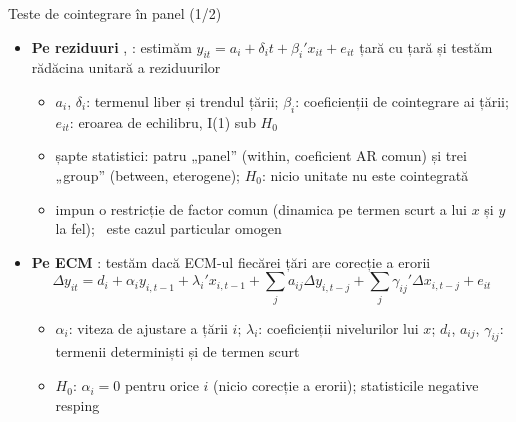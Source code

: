 \begin{frame}{Teste de cointegrare în panel (1/2)}
\itemsize{\small}
\begin{itemize}
    \item \textbf{Pe reziduuri} , : estimăm $y_{it} = a_i + \delta_it + \beta_i'x_{it} + e_{it}$ țară cu țară și testăm rădăcina unitară a reziduurilor
    \begin{itemize}
        \item $a_i$, $\delta_i$: termenul liber și trendul țării; $\beta_i$: coeficienții de cointegrare ai țării; $e_{it}$: eroarea de echilibru, I(1) sub $H_0$
        \item șapte statistici: patru „panel” (within, coeficient AR comun) și trei „group” (between, eterogene); $H_0$: nicio unitate nu este cointegrată
        \item impun o restricție de factor comun (dinamica pe termen scurt a lui $x$ și $y$ la fel); \ este cazul particular omogen
    \end{itemize}
    \item \textbf{Pe ECM} : testăm dacă ECM-ul fiecărei țări are corecție a erorii \[ \Delta y_{it} = d_i + \alpha_iy_{i,t-1} + \lambda_i'x_{i,t-1} + \sum_j a_{ij}\Delta y_{i,t-j} + \sum_j\gamma_{ij}'\Delta x_{i,t-j} + e_{it} \]
    \begin{itemize}
        \item $\alpha_i$: viteza de ajustare a țării $i$; $\lambda_i$: coeficienții nivelurilor lui $x$; $d_i$, $a_{ij}$, $\gamma_{ij}$: termenii determiniști și de termen scurt
        \item $H_0$: $\alpha_i = 0$ pentru orice $i$ (nicio corecție a erorii); statisticile negative resping
    \end{itemize}
\end{itemize}
\end{frame}

